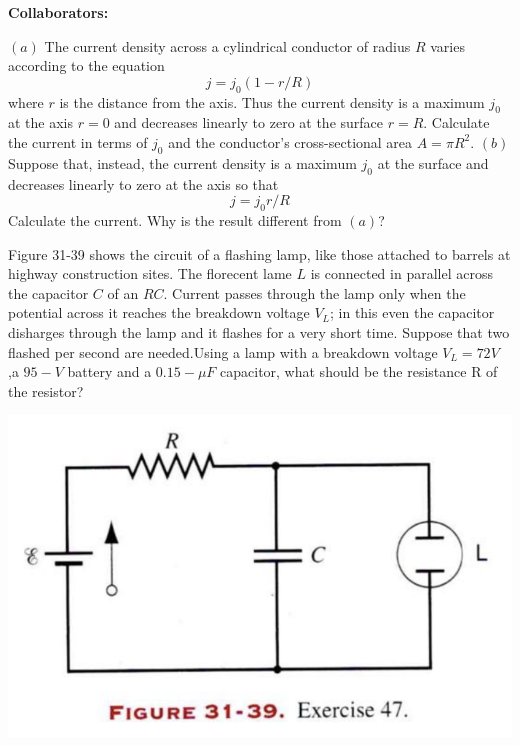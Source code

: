 \documentclass[11pt,letterpaper,boxed]{hmcpset}
\begin{document}
\noindent\textbf{Collaborators:} 


\begin{problem}
$(a)$ The current density across a cylindrical conductor of radius $R$ varies according to the equation
$$ j = j_0(1-r/R)$$
where $r$ is the distance from the axis. Thus the current density is a maximum $j_0$ at the axis $r=0$ and decreases linearly to zero at the surface $r=R$. Calculate the current in terms of $j_0$ and the conductor's cross-sectional area $A= \pi R^2$. $(b)$ Suppose that, instead, the current density is a maximum $j_0$ at the surface and decreases linearly to zero at the axis so that $$ j = j_0r/R$$ Calculate the current. Why is the result different from $(a)$?
\end{problem}

\begin{solution}
\vfill
\end{solution}
\newpage

\begin{problem}[HRK 31.47]
Figure 31-39 shows the circuit of a flashing lamp, like those attached to barrels at highway construction sites. The florecent lame $L$ is connected in parallel across the capacitor $C$ of an $RC$. Current passes through the lamp only when the potential across it reaches the breakdown voltage $V_L$; in this even the capacitor disharges through the lamp and it flashes for a very short time. Suppose that two flashed per second are needed.Using a lamp with a breakdown voltage $V_L= 72 V$ ,a $ 95-V$ battery and a $0.15-\mu F$ capacitor, what should be the resistance R of the resistor? 
\begin{center}
\includegraphics[scale=0.6]{31-39.png}
\end{center}
\end{problem}

\begin{solution}
\vfill
\end{solution}
\newpage
\end{document}
